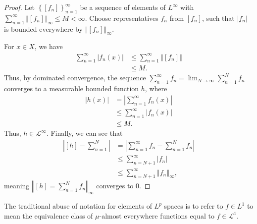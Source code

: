 \documentclass[10pt]{extarticle}
\newcommand{\norm}[1]{\left\Vert #1\right\Vert}
\newcommand{\set}[1]{\left\{#1\right\}}
\theoremstyle{plain}
\theoremstyle{definition}
\theoremstyle{note}
\renewcommand{\newline}{\hfill\break}
\begin{document}
\begin{proof}
  Let $\set{[f_n]}_{n=1}^{\infty}$ be a sequence of elements of $L^{\infty}$ with $\sum_{n=1}^{\infty}\norm{[f_n]}_{\infty}\leq M < \infty$. Choose representatives $f_n$ from $[f_n]$, such that $\left\vert f_n \right\vert$ is bounded everywhere by $\norm{[f_n]}_{\infty}$.\newline

  For $x\in X$, we have
  \begin{align*}
    \sum_{n=1}^{\infty}\left\vert f_n(x) \right\vert &\leq \sum_{n=1}^{\infty}\norm{[f_n]}\\
                                                     &\leq M.
  \end{align*}
  Thus, by dominated convergence, the sequence $\sum_{n=1}^{\infty}f_n = \lim_{N\rightarrow\infty}\sum_{n=1}^{N}f_n$ converges to a measurable bounded function $h$, where
  \begin{align*}
    \left\vert h(x) \right\vert &= \left\vert \sum_{n=1}^{\infty}f_n(x) \right\vert\\
                                &\leq \sum_{n=1}^{\infty}\left\vert f_n(x) \right\vert\\
                                &\leq M.
  \end{align*}
  Thus, $h\in \mathcal{L}^{\infty}$. Finally, we can see that
  \begin{align*}
    \left\vert [h] - \sum_{n=1}^{N} \right\vert &= \left\vert \sum_{n=1}^{\infty}f_n - \sum_{n=1}^{N} f_n \right\vert\\
                                                &\leq \sum_{n=N + 1}^{\infty}\left\vert f_n\right\vert\\
                                                &\leq \sum_{n=N+1}^{\infty}\norm{f_n}_{\infty},
  \end{align*}
  meaning $\norm{[h] = \sum_{n=1}^{N}f_n}_{\infty}$ converges to $0$.
\end{proof}
The traditional abuse of notation for elements of $L^{p}$ spaces is to refer to $f\in L^{1}$ to mean the equivalence class of $\mu$-almost everywhere functions equal to $f\in \mathcal{L}^{1}$.\newline
\end{document}
